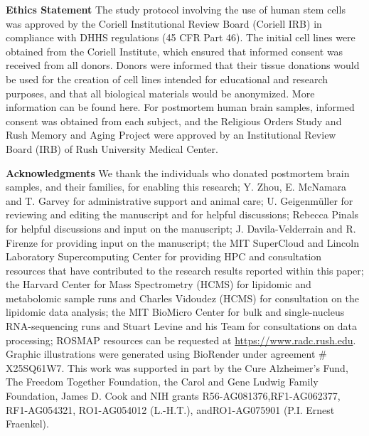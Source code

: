 \textbf{Ethics Statement}\newline\newline
The study protocol involving the use of human stem cells was approved by the Coriell Institutional Review Board (Coriell IRB) in compliance with DHHS regulations (45 CFR Part 46). The initial cell lines were obtained from the Coriell Institute, which ensured that informed consent was received from all donors. Donors were informed that their tissue donations would be used for the creation of cell lines intended for educational and research purposes, and that all biological materials would be anonymized. More information can be found here. For postmortem human brain samples, informed consent was obtained from each subject, and the Religious Orders Study and Rush Memory and Aging Project were approved by an Institutional Review Board (IRB) of Rush University Medical Center.

\textbf{Acknowledgments}\newline\newline
We thank the individuals who donated postmortem brain samples, and their families, for enabling this research; Y. Zhou, E. McNamara and T. Garvey for administrative support and animal care; U. Geigenmüller for reviewing and editing the manuscript and for helpful discussions; Rebecca Pinals for helpful discussions and input on the manuscript; J. Davila-Velderrain and R. Firenze for providing input on the manuscript; the MIT SuperCloud and Lincoln Laboratory Supercomputing Center for providing HPC and consultation resources that have contributed to the research results reported within this paper; the Harvard Center for Mass Spectrometry (HCMS) for lipidomic and metabolomic sample runs and Charles Vidoudez (HCMS) for consultation on the lipidomic data analysis; the MIT BioMicro Center for bulk and single-nucleus RNA-sequencing runs and Stuart Levine and his Team for consultations on data processing; ROSMAP resources can be requested at \url{https://www.radc.rush.edu}. Graphic illustrations were generated using BioRender under agreement \# X25SQ61W7. This work was supported in part by the Cure Alzheimer’s Fund, The Freedom Together Foundation, the Carol and Gene Ludwig Family Foundation, James D. Cook and NIH grants R56-AG081376,RF1-AG062377, RF1-AG054321, RO1-AG054012 (L.-H.T.), andRO1-AG075901 (P.I. Ernest Fraenkel).


